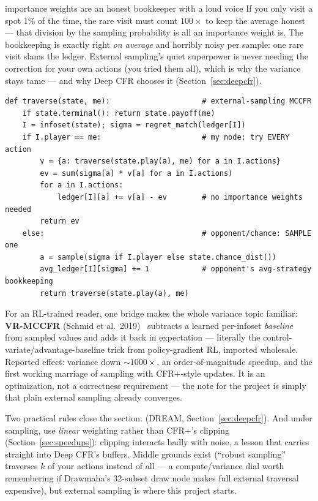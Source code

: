 \begin{intuition}{importance weights are an honest bookkeeper with a loud voice}
If you only visit a spot 1\% of the time, the rare visit must count $100\times$ to keep the average honest --- that division by the sampling probability is all an importance weight is. The bookkeeping is exactly right \emph{on average} and horribly noisy per sample: one rare visit slams the ledger. External sampling's quiet superpower is never needing the correction for your own actions (you tried them all), which is why the variance stays tame --- and why Deep CFR chooses it (Section~\ref{sec:deepcfr}).
\end{intuition}

\begin{lstlisting}
def traverse(state, me):                     # external-sampling MCCFR
    if state.terminal(): return state.payoff(me)
    I = infoset(state); sigma = regret_match(ledger[I])
    if I.player == me:                       # my node: try EVERY action
        v = {a: traverse(state.play(a), me) for a in I.actions}
        ev = sum(sigma[a] * v[a] for a in I.actions)
        for a in I.actions:
            ledger[I][a] += v[a] - ev        # no importance weights needed
        return ev
    else:                                    # opponent/chance: SAMPLE one
        a = sample(sigma if I.player else state.chance_dist())
        avg_ledger[I][sigma] += 1            # opponent's avg-strategy bookkeeping
        return traverse(state.play(a), me)
\end{lstlisting}

For an RL-trained reader, one bridge makes the whole variance topic familiar: \textbf{VR-MCCFR} (Schmid et al.\ 2019)~\cite{schmid2019vr} subtracts a learned per-infoset \emph{baseline} from sampled values and adds it back in expectation --- literally the control-variate/advantage-baseline trick from policy-gradient RL, imported wholesale. Reported effect: variance down $\sim1000\times$, an order-of-magnitude speedup, and the first working marriage of sampling with CFR+-style updates. It is an optimization, not a correctness requirement --- the note for the project is simply that plain external sampling already converges.

Two practical rules close the section.  (DREAM, Section~\ref{sec:deepcfr}). And under sampling, use \emph{linear} weighting rather than CFR+'s clipping (Section~\ref{sec:speedups}): clipping interacts badly with noise, a lesson that carries straight into Deep CFR's buffers. Middle grounds exist (``robust sampling'' traverses $k$ of your actions instead of all --- a compute/variance dial worth remembering if Drawmaha's 32-subset draw node makes full external traversal expensive), but external sampling is where this project starts.
